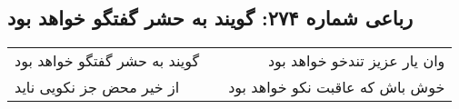\begin{center}
\section*{رباعی شماره ۲۷۴: گویند به حشر گفتگو خواهد بود}
\label{sec:sh274}
\begin{longtable}{l p{0.5cm} r}
گویند به حشر گفتگو خواهد بود
&&
وان یار عزیز تندخو خواهد بود
\\
از خیر محض جز نکویی ناید
&&
خوش باش که عاقبت نکو خواهد بود
\\
\end{longtable}
\end{center}
